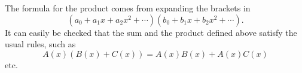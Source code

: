 The formula for the product comes from expanding the brackets in
\[
(a_0 + a_1 x + a_2 x^2 + \cdots)(b_0 + b_1 x + b_2 x^2 + \cdots).
\]
It can easily be checked that the sum and the product defined above satisfy the usual rules, such as
\[
A(x)(B(x) + C(x)) = A(x)B(x) + A(x)C(x)
\]
etc.
